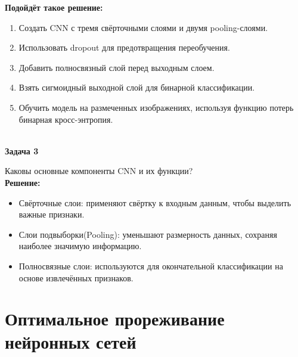 \begin{description}
\textbf{Подойдёт такое решение:}

\begin{enumerate}
    \item Создать CNN с тремя свёрточными слоями и двумя pooling-слоями.
    \item Использовать dropout для предотвращения переобучения.
    \item Добавить полносвязный слой перед выходным слоем.
    \item Взять сигмоидный выходной слой для бинарной классификации.
    \item Обучить модель на размеченных изображениях, используя функцию потерь бинарная кросс-энтропия.\end{enumerate}\\

\textbf{Задача 3}

Каковы основные компоненты CNN и их функции?\\
\textbf{Решение:}
\begin{itemize}
    \item Свёрточные слои: применяют свёртку к входным данным, чтобы выделить важные признаки.
    \item Слои подвыборки(Pooling): уменьшают размерность данных, сохраняя наиболее значимую информацию.
    \item Полносвязные слои: используются для окончательной классификации на основе извлечённых признаков.
\end{itemize}

\end{description}


\section*{Оптимальное прореживание нейронных сетей}

